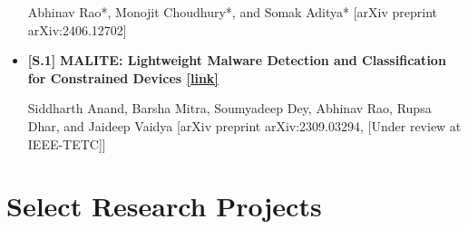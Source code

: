 \documentclass[11pt,letterpaper]{article}
\begin{document}
\begin{itemize}[leftmargin=*,label={},itemsep=4pt]
        Abhinav Rao*, Monojit Choudhury*, and Somak Aditya*
        [arXiv preprint arXiv:2406.12702]
    
       
    \item {\color{maincolor}\textbf{[S.1]}} \textbf{MALITE: Lightweight Malware Detection and Classification for Constrained Devices \href{https://arxiv.org/abs/2309.03294}{[link]}}  
          
        Siddharth Anand, Barsha Mitra, Soumyadeep Dey, Abhinav Rao, Rupsa Dhar, and Jaideep Vaidya
        [arXiv preprint arXiv:2309.03294, [Under review at IEEE-TETC]]
    
       
\end{itemize}

\section*{Select Research Projects}
\end{document}
